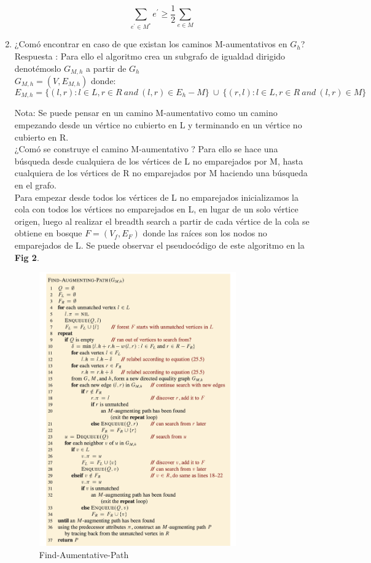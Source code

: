\documentclass[sn-mathphys,Numbered]{sn-jnl}%
\theoremstyle{thmstyleone}%
\theoremstyle{thmstyletwo}%
\theoremstyle{thmstylethree}%
\begin{document}
\begin{enumerate}
    \[
    \sum_{e^{'}\in M^*} e^{'} \geq \frac{1}{2}\sum_{e\in M}
    \]
    \item ¿Com\'o encontrar en caso de que existan los caminos M-aumentativos en $G_h$? \\
    Respuesta : Para ello el algoritmo  crea un subgrafo de igualdad dirigido denotémoslo $G_{M,h}$ a partir de $G_h$\\
    $G_{M,h} = (V,E_{M,h})$ donde:
    \begin{equation}
         E_{M,h} = \{(l,r) : l \in L , r \in R~and~ (l,r) \in E_h - M \}~\cup ~\{(r,l) :l \in L , r \in R~and~ (l,r) \in M \}
    \end{equation}
   
    Nota: Se puede pensar en un camino M-aumentativo como un camino empezando desde un vértice no cubierto en L y terminando en un vértice no cubierto en R.\\
    ¿Com\'o se construye el camino M-aumentativo ?
    Para ello se hace una búsqueda desde cualquiera de los vértices de L no emparejados por M, hasta cualquiera de los vértices de R no emparejados por M haciendo una búsqueda en el grafo.\\
    Para empezar desde todos los vértices de L no emparejados inicializamos la cola con todos los vértices no  emparejados en L, en lugar de un solo vértice origen, luego al realizar el breadth search a partir de cada vértice de la cola se obtiene en bosque $F = (V_f,E_F)$ donde las raíces son los nodos no emparejados de L. Se puede observar el pseudocódigo de este algoritmo en la \textbf{Fig 2}.
    
    \begin{figure}[htb]
        \centering
        \includegraphics[width=0.8\textwidth]{Screenshot 2023-04-02 at 2.48.49 PM.png}
        \centering
        \caption{Find-Aumentative-Path\cite{4}}
    \end{figure}
    

\end{enumerate}
\end{document}
